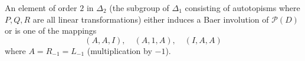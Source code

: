 An element of order $2$ in $\Delta_2$ (the subgroup of $\Delta_1$ consisting of autotopisms where $P, Q, R$ are all linear transformations) either induces a Baer involution of $\mathcal{P}(D)$ or is one of the mappings
$$(A, A, I), \quad (A, 1, A), \quad (I, A, A)$$
where $A = R_{-1} = L_{-1}$ (multiplication by $-1$).
